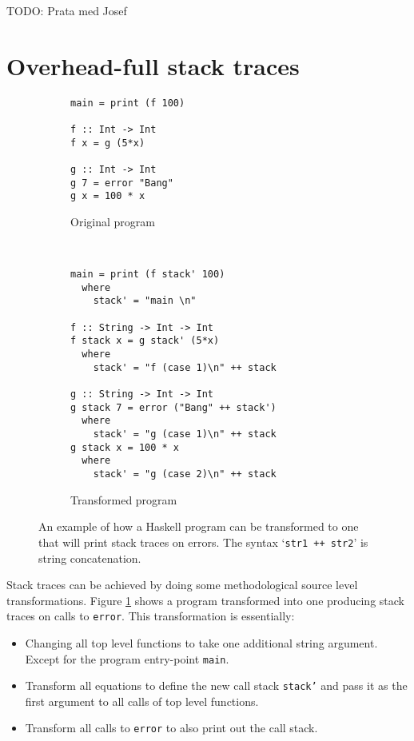 TODO: Prata med Josef

\section{Overhead-full stack traces} \label{sec:overhead_full}

\begin{figure}
        \begin{subfigure}[t]{0.5\textwidth}
            \begin{verbatim}
main = print (f 100)

f :: Int -> Int
f x = g (5*x)

g :: Int -> Int
g 7 = error "Bang"
g x = 100 * x
            \end{verbatim}
            \caption{Original program}
        \end{subfigure}
        ~ %
        \begin{subfigure}[t]{0.5\textwidth}
          \begin{verbatim}
main = print (f stack' 100)
  where
    stack' = "main \n"

f :: String -> Int -> Int
f stack x = g stack' (5*x)
  where
    stack' = "f (case 1)\n" ++ stack

g :: String -> Int -> Int
g stack 7 = error ("Bang" ++ stack')
  where
    stack' = "g (case 1)\n" ++ stack
g stack x = 100 * x
  where
    stack' = "g (case 2)\n" ++ stack
          \end{verbatim}
          \caption{Transformed program}
        \end{subfigure}
        \caption{An example of how a Haskell program can be transformed to one
          that will print stack traces on errors. The syntax `\texttt{str1 ++
            str2}' is string concatenation.
        }\label{fig:transformation}
\end{figure}

Stack traces can be achieved by doing some methodological source level
transformations. Figure \ref{fig:transformation} shows a program transformed
into one producing stack traces on calls to \texttt{error}. This transformation is essentially:

\begin{itemize}
\itemsep1pt\parskip0pt
\item
  Changing all top level functions to take one additional string
  argument. Except for the program entry-point \texttt{main}.
\item
  Transform all equations to define the new call stack \texttt{stack'} and
  pass it as the first argument to all calls of top level functions.
\item
  Transform all calls to \texttt{error} to also print out the call stack.
\end{itemize}

